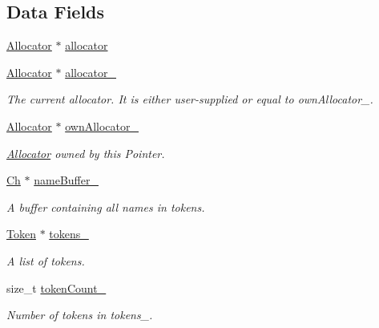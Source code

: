 \subsection*{Data Fields}
\begin{DoxyCompactItemize}
\item 
\mbox{\hyperlink{classrapidjson_1_1_allocator}{Allocator}} $\ast$ \mbox{\hyperlink{classrapidjson_1_1_generic_pointer_a3e671447cf032271956fa984aad23ef7}{allocator}}
\item 
\mbox{\hyperlink{classrapidjson_1_1_allocator}{Allocator}} $\ast$ \mbox{\hyperlink{classrapidjson_1_1_generic_pointer_a303e16e7d6c391a2afe8669744f79897}{allocator\+\_\+}}
\begin{DoxyCompactList}\small\item\em The current allocator. It is either user-\/supplied or equal to own\+Allocator\+\_\+. \end{DoxyCompactList}\item 
\mbox{\hyperlink{classrapidjson_1_1_allocator}{Allocator}} $\ast$ \mbox{\hyperlink{classrapidjson_1_1_generic_pointer_a8798d7fdb02cd5b95bf032760aed8445}{own\+Allocator\+\_\+}}
\begin{DoxyCompactList}\small\item\em \mbox{\hyperlink{classrapidjson_1_1_allocator}{Allocator}} owned by this Pointer. \end{DoxyCompactList}\item 
\mbox{\hyperlink{classrapidjson_1_1_generic_pointer_a850f78846c5548565f8395be5f3427b7}{Ch}} $\ast$ \mbox{\hyperlink{classrapidjson_1_1_generic_pointer_a38f23dc869001b53149804e563f6a465}{name\+Buffer\+\_\+}}
\begin{DoxyCompactList}\small\item\em A buffer containing all names in tokens. \end{DoxyCompactList}\item 
\mbox{\hyperlink{structrapidjson_1_1_generic_pointer_1_1_token}{Token}} $\ast$ \mbox{\hyperlink{classrapidjson_1_1_generic_pointer_ad76284430e5e54ed22a4c93dc59e00c7}{tokens\+\_\+}}
\begin{DoxyCompactList}\small\item\em A list of tokens. \end{DoxyCompactList}\item 
size\+\_\+t \mbox{\hyperlink{classrapidjson_1_1_generic_pointer_acb657759c16fa63da15186db8c29122b}{token\+Count\+\_\+}}
\begin{DoxyCompactList}\small\item\em Number of tokens in tokens\+\_\+. \end{DoxyCompactList}\item 

\end{DoxyCompactItemize}

